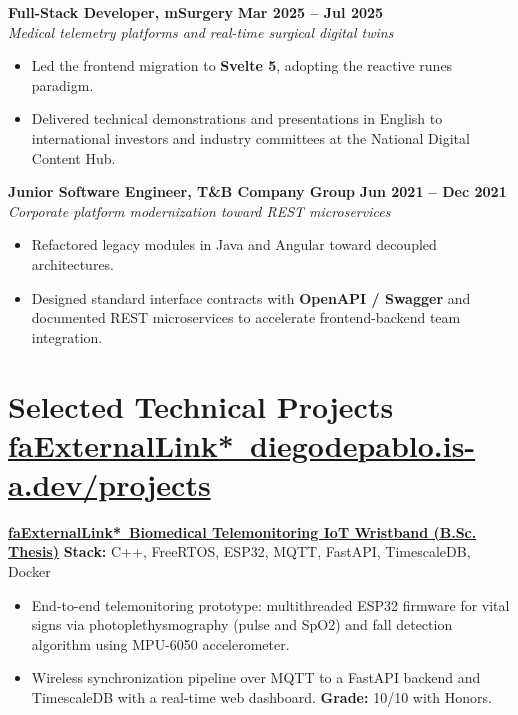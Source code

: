 \documentclass[a4paper,10pt]{article}
\begin{document}
\vspace{5pt}

\noindent\textbf{Full-Stack Developer, mSurgery} \hfill {\footnotesize\color{subtext}\textbf{Mar 2025 -- Jul 2025}} \\
{\footnotesize\color{subtext}\textit{Medical telemetry platforms and real-time surgical digital twins}}
\begin{itemize}
  \item Led the frontend migration to \textbf{Svelte 5}, adopting the reactive runes paradigm.
  \item Delivered technical demonstrations and presentations in English to international investors and industry committees at the National Digital Content Hub.
\end{itemize}

\vspace{5pt}

\noindent\textbf{Junior Software Engineer, T\&B Company Group} \hfill {\footnotesize\color{subtext}\textbf{Jun 2021 -- Dec 2021}} \\
{\footnotesize\color{subtext}\textit{Corporate platform modernization toward REST microservices}}
\begin{itemize}
  \item Refactored legacy modules in Java and Angular toward decoupled architectures.
  \item Designed standard interface contracts with \textbf{OpenAPI / Swagger} and documented REST microservices to accelerate frontend-backend team integration.
\end{itemize}

\section*{Selected Technical Projects \hfill {\normalfont\scriptsize\color{subtext}\href{https://diegodepablo.is-a.dev/projects}{\csname faExternalLink*\endcsname\ diegodepablo.is-a.dev/projects}}}

\noindent\textbf{\href{https://diegodepablo.is-a.dev/projects/tfg-patient-monitoring}{\csname faExternalLink*\endcsname\ Biomedical Telemonitoring IoT Wristband (B.Sc. Thesis)}} \hfill {\scriptsize\color{subtext}\textbf{Stack:} C++, FreeRTOS, ESP32, MQTT, FastAPI, TimescaleDB, Docker}
\begin{itemize}
  \item End-to-end telemonitoring prototype: multithreaded ESP32 firmware for vital signs via photoplethysmography (pulse and SpO2) and fall detection algorithm using MPU-6050 accelerometer.
  \item Wireless synchronization pipeline over MQTT to a FastAPI backend and TimescaleDB with a real-time web dashboard. \textbf{Grade:} 10/10 with Honors.
\end{itemize}
\end{document}
